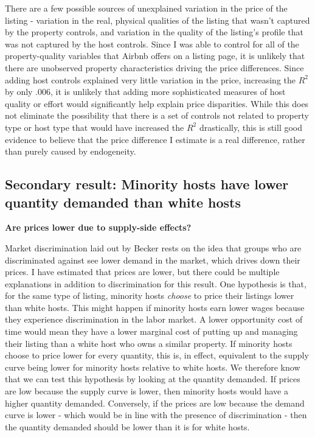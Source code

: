There are a few possible sources of unexplained variation in the price of the listing - variation in the real, physical qualities of the listing that wasn't captured by the property controls, and variation in the quality of the listing's profile that was not captured by the host controls. Since I was able to control for all of the property-quality variables that Airbnb offers on a listing page, it is unlikely that there are unobserved property characteristics driving the price differences. Since adding host controls explained very little variation in the price, increasing the $R^2$ by only .006, it is unlikely that adding more sophisticated measures of host quality or effort would significantly help explain price disparities. While this does not eliminate the possibility that there is a set of controls not related to property type or host type that would have increased the $R^2$ drastically, this is still good evidence to believe that the price difference I estimate is a real difference, rather than purely caused by endogeneity. 

\subsection{Secondary result: Minority hosts have lower quantity demanded than white hosts}
\textbf{Are prices lower due to supply-side effects?}

Market discrimination laid out by Becker rests on the idea that groups who are discriminated against see lower demand in the market, which drives down their prices. I have estimated that prices are lower, but there could be multiple explanations in addition to discrimination for this result. One hypothesis is that, for the same type of listing, minority hosts \textit{choose} to price their listings lower than white hosts. This might happen if minority hosts earn lower wages because they experience discrimination in the labor market. A lower opportunity cost of time would mean they have a lower marginal cost of putting up and managing their listing than a white host who owns a similar property. If minority hosts choose to price lower for every quantity, this is, in effect, equivalent to the supply curve being lower for minority hosts relative to white hosts. We therefore know that we can test this hypothesis by looking at the quantity demanded. If prices are low because the supply curve is lower, then minority hosts would have a higher quantity demanded. Conversely, if the prices are low because the demand curve is lower - which would be in line with the presence of discrimination - then the quantity demanded should be lower than it is for white hosts. 

